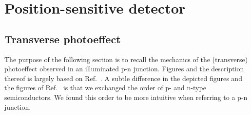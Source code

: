 \section{Position-sensitive detector}

\subsection{Transverse photoeffect}

The purpose of the following section is to recall the mechanics of the (transverse) photoeffect observed in an illuminated p-n junction.
Figures and the description thereof is largely based on Ref.~\cite{Simon13}.
A subtle difference in the depicted figures and the figures of Ref.~\cite{Simon13} is that we exchanged the order of p- and n-type semiconductors.
We found this order to be more intuitive when referring to a p-n junction.

